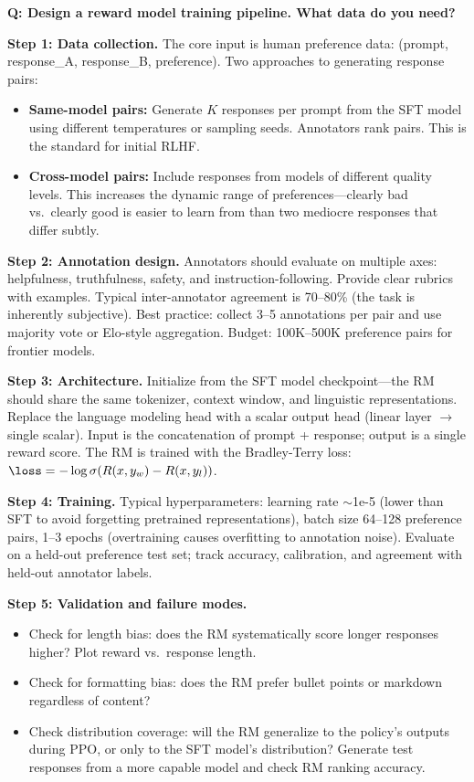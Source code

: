 \begin{interviewq}
\textbf{Q: Design a reward model training pipeline. What data do you need?}

 \quad {} \quad \badgefreq{\freqmed}

\stronganswer

\textbf{Step 1: Data collection.} The core input is human preference data: (prompt, response\_A, response\_B, preference). Two approaches to generating response pairs:
\begin{itemize}
    \item \textbf{Same-model pairs:} Generate $K$ responses per prompt from the SFT model using different temperatures or sampling seeds. Annotators rank pairs. This is the standard for initial RLHF.
    \item \textbf{Cross-model pairs:} Include responses from models of different quality levels. This increases the dynamic range of preferences---clearly bad vs.\ clearly good is easier to learn from than two mediocre responses that differ subtly.
\end{itemize}

\textbf{Step 2: Annotation design.} Annotators should evaluate on multiple axes: helpfulness, truthfulness, safety, and instruction-following. Provide clear rubrics with examples. Typical inter-annotator agreement is 70--80\% (the task is inherently subjective). Best practice: collect 3--5 annotations per pair and use majority vote or Elo-style aggregation. Budget: 100K--500K preference pairs for frontier models.

\textbf{Step 3: Architecture.} Initialize from the SFT model checkpoint---the RM should share the same tokenizer, context window, and linguistic representations. Replace the language modeling head with a scalar output head (linear layer $\rightarrow$ single scalar). Input is the concatenation of prompt + response; output is a single reward score. The RM is trained with the Bradley-Terry loss: $\loss = -\log\sigma(R(x, y_w) - R(x, y_l))$.

\textbf{Step 4: Training.} Typical hyperparameters: learning rate $\sim$1e-5 (lower than SFT to avoid forgetting pretrained representations), batch size 64--128 preference pairs, 1--3 epochs (overtraining causes overfitting to annotation noise). Evaluate on a held-out preference test set; track accuracy, calibration, and agreement with held-out annotator labels.

\textbf{Step 5: Validation and failure modes.}
\begin{itemize}
    \item Check for length bias: does the RM systematically score longer responses higher? Plot reward vs.\ response length.
    \item Check for formatting bias: does the RM prefer bullet points or markdown regardless of content?
    \item Check distribution coverage: will the RM generalize to the policy's outputs during PPO, or only to the SFT model's distribution? Generate test responses from a more capable model and check RM ranking accuracy.
\end{itemize}


\end{interviewq}

